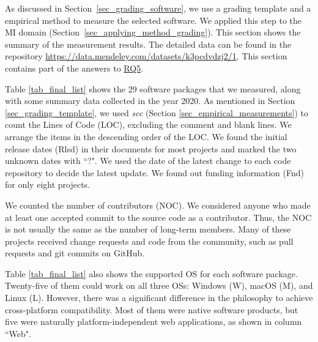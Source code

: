 \documentclass[3p, 12pt,authoryear]{elsarticle}
\begin{document}
As discussed in Section~\ref{sec_grading_software}, we use a grading template
and a empirical method to measure the selected software. We applied this step to
the MI domain (Section~\ref{sec_applying_method_grading}). This section shows
the summary of the measurement results. The detailed data can be found in the
repository
\hyperlink{https://data.mendeley.com/datasets/k3pcdvdzj2/1}{https://data.mendeley.com/datasets/k3pcdvdzj2/1}.
This section contains part of the answers to \hyperlink{rq5}{RQ5}.

Table \ref{tab_final_list} shows the 29 software packages that we measured,
along with some summary data collected in the year 2020. As mentioned in Section
\ref{sec_grading_template}, we used \textit{scc} (Section
\ref{sec_empirical_measurements}) to count the Lines of Code (LOC), excluding
the comment and blank lines. We arrange the items in the descending order of the
LOC. We found the initial release dates (Rlsd) in their documents for most
projects and marked the two unknown dates with ``?". We used the date of the
latest change to each code repository to decide the latest update. We found out
funding information (Fnd) for only eight projects.

We counted the number of contributors (NOC). We considered anyone who made at
least one accepted commit to the source code as a contributor. Thus, the NOC is
not usually the same as the number of long-term members. Many of these projects
received change requests and code from the community, such as pull requests and
git commits on GitHub.

Table \ref{tab_final_list} also shows the supported OS for each software
package. Twenty-five of them could work on all three OSs: Windows (W), macOS
(M), and Linux (L). However, there was a significant difference in the
philosophy to achieve cross-platform compatibility. Most of them were native
software products, but five were naturally platform-independent web
applications, as shown in column ``Web".
\end{document}
